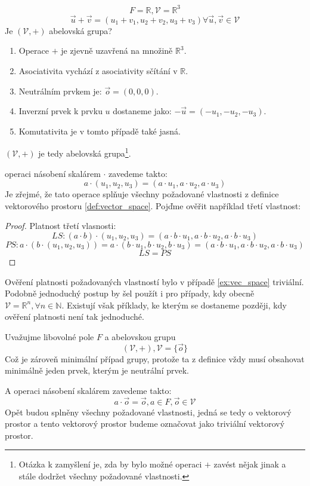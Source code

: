 \begin{example}
    $$F = \mathbb{R}, \mathcal{V} = \mathbb{R}^3$$
    $$\vec{u} + \vec{v} = (u_1 + v_1, u_2 + v_2, u_3 + v_3)
    \forall \vec{u}, \vec{v} \in \mathcal{V}$$
    Je $(\mathcal{V}, +)$ abelovská grupa?
    \begin{enumerate}[start=0]
        \item Operace $+$ je zjevně uzavřená na množině $\mathbb{R}^3$.
        \item Asociativita vychází z asociativity sčítání v $\mathbb{R}$.
        \item Neutrálním prvkem je: $\vec{o} = (0, 0, 0)$.
        \item Inverzní prvek k prvku $u$ dostaneme jako: $-\vec{u} = (-u_1, -u_2, -u_3)$.
        \item Komutativita je v tomto případě také jasná.
    \end{enumerate}
    $(\mathcal{V}, +)$ je tedy abelovská grupa\footnote{Otázka k zamyšlení je, zda by bylo
    možné operaci $+$ zavést nějak jinak a stále dodržet všechny požadované vlastnosti.}.

    operaci násobení skalárem $\cdot$ zavedeme takto:
    $$a \cdot (u_1, u_2, u_3) = (a \cdot u_1, a \cdot u_2, a \cdot u_3)$$
    Je zřejmé, že tato operace splňuje všechny požadované vlastnosti z definice
    vektorového prostoru \ref{def:vector_space}. Pojďme ověřit například třetí vlastnost:
    \begin{proof} Platnost třetí vlasnosti:
        $$LS: (a \cdot b) \cdot (u_1, u_2, u_3) =
        (a \cdot b \cdot u_1, a \cdot b \cdot u_2, a \cdot b \cdot u_3)$$
        $$PS: a\cdot (b \cdot (u_1, u_2, u_3)) = a \cdot (b \cdot u_1, b \cdot u_2, b \cdot u_3) =
        (a \cdot b \cdot u_1, a \cdot b \cdot u_2, a \cdot b \cdot u_3)$$
        $$LS = PS$$
    \end{proof}
    \label{ex:vec_space}
\end{example}

Ověření platnosti požadovaných vlastností bylo v případě \ref{ex:vec_space} triviální.
Podobně jednoduchý postup by šel použít i pro případy, kdy obecně
$\mathcal{V} = \mathbb{R}^n, \forall n \in \mathbb{N}$. Existují však příklady, ke kterým
se dostaneme později, kdy ověření platnosti není tak jednoduché.

\begin{definition}
    Uvažujme libovolné pole $F$ a abelovskou grupu
    $$(\mathcal{V}, +), \mathcal{V} = \{\vec{o}\}$$
    Což je zároveň minimální případ grupy, protože ta z definice vždy musí
    obsahovat minimálně jeden prvek, kterým je neutrální prvek.

    A operaci násobení skalárem zavedeme takto:
    $$a \cdot \vec{o} = \vec{o}, a \in F, \vec{o} \in \mathcal{V}$$
    Opět budou splněny všechny požadované vlastnosti, jedná se tedy o vektorový prostor
    a tento vektorový prostor budeme označovat jako triviální vektorový prostor.
\end{definition}

